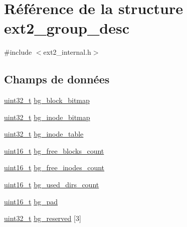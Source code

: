 \hypertarget{structext2__group__desc}{\section{Référence de la structure ext2\+\_\+group\+\_\+desc}
\label{structext2__group__desc}
}


{\ttfamily \#include $<$ext2\+\_\+internal.\+h$>$}

\subsection*{Champs de données}
\begin{DoxyCompactItemize}
\item 
\hyperlink{kernel_2include_2types_8h_a33594304e786b158f3fb30289278f5af}{uint32\+\_\+t} \hyperlink{structext2__group__desc_a57481ebe34986e28812cc9b4e122c016}{bg\+\_\+block\+\_\+bitmap}
\item 
\hyperlink{kernel_2include_2types_8h_a33594304e786b158f3fb30289278f5af}{uint32\+\_\+t} \hyperlink{structext2__group__desc_a7ba3737304b14529a45aede6381aa968}{bg\+\_\+inode\+\_\+bitmap}
\item 
\hyperlink{kernel_2include_2types_8h_a33594304e786b158f3fb30289278f5af}{uint32\+\_\+t} \hyperlink{structext2__group__desc_abf527c572a5fe30354cdf2cfc4f88b26}{bg\+\_\+inode\+\_\+table}
\item 
\hyperlink{kernel_2include_2types_8h_adf4d876453337156dde61095e1f20223}{uint16\+\_\+t} \hyperlink{structext2__group__desc_af1cf7574780c76da67e973179f6edd43}{bg\+\_\+free\+\_\+blocks\+\_\+count}
\item 
\hyperlink{kernel_2include_2types_8h_adf4d876453337156dde61095e1f20223}{uint16\+\_\+t} \hyperlink{structext2__group__desc_a5488cd2eb4ea863ca9d15a5df8da6bab}{bg\+\_\+free\+\_\+inodes\+\_\+count}
\item 
\hyperlink{kernel_2include_2types_8h_adf4d876453337156dde61095e1f20223}{uint16\+\_\+t} \hyperlink{structext2__group__desc_adc9924671cb04dd63b4b7ffff8c262dc}{bg\+\_\+used\+\_\+dirs\+\_\+count}
\item 
\hyperlink{kernel_2include_2types_8h_adf4d876453337156dde61095e1f20223}{uint16\+\_\+t} \hyperlink{structext2__group__desc_ac99983cee73aa4aace5c7d51b6d5a7e1}{bg\+\_\+pad}
\item 
\hyperlink{kernel_2include_2types_8h_a33594304e786b158f3fb30289278f5af}{uint32\+\_\+t} \hyperlink{structext2__group__desc_aff7f7dc0b67aed284218b238991f5c93}{bg\+\_\+reserved} \mbox{[}3\mbox{]}
\end{DoxyCompactItemize}


